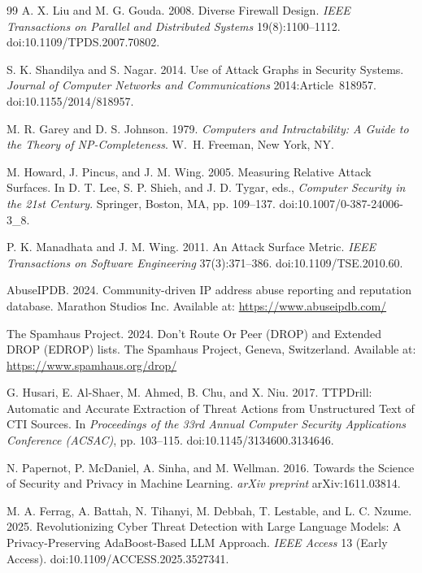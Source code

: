 \documentclass[unnumsec,webpdf,contemporary,large]{oup-authoring-template}
\theoremstyle{thmstyleone}
\theoremstyle{thmstyletwo}
\theoremstyle{thmstylethree}
\begin{document}
\begin{thebibliography}{99}
A. X. Liu and M. G. Gouda. 2008. Diverse Firewall Design.
\textit{IEEE Transactions on Parallel and Distributed Systems}
19(8):1100--1112. doi:10.1109/TPDS.2007.70802.

S. K. Shandilya and S. Nagar. 2014. Use of Attack Graphs in Security Systems.
\textit{Journal of Computer Networks and Communications} 2014:Article~818957.
doi:10.1155/2014/818957.

M. R. Garey and D. S. Johnson. 1979. \textit{Computers and Intractability:
A Guide to the Theory of NP-Completeness}. W.~H. Freeman, New York, NY.

M. Howard, J. Pincus, and J. M. Wing. 2005. Measuring Relative Attack Surfaces.
In D. T. Lee, S. P. Shieh, and J. D. Tygar, eds., \textit{Computer Security in the
21st Century}. Springer, Boston, MA, pp. 109--137.
doi:10.1007/0-387-24006-3\_8.

P. K. Manadhata and J. M. Wing. 2011. An Attack Surface Metric.
\textit{IEEE Transactions on Software Engineering} 37(3):371--386.
doi:10.1109/TSE.2010.60.

AbuseIPDB. 2024. Community-driven IP address abuse reporting and reputation database.
Marathon Studios Inc. Available at: \url{https://www.abuseipdb.com/}

The Spamhaus Project. 2024. Don't Route Or Peer (DROP) and Extended DROP (EDROP)
lists. The Spamhaus Project, Geneva, Switzerland. Available at:
\url{https://www.spamhaus.org/drop/}

G. Husari, E. Al-Shaer, M. Ahmed, B. Chu, and X. Niu. 2017. TTPDrill: Automatic and
Accurate Extraction of Threat Actions from Unstructured Text of CTI Sources.
In \textit{Proceedings of the 33rd Annual Computer Security Applications Conference
(ACSAC)}, pp. 103--115. doi:10.1145/3134600.3134646.

N. Papernot, P. McDaniel, A. Sinha, and M. Wellman. 2016. Towards the Science of
Security and Privacy in Machine Learning. \textit{arXiv preprint} arXiv:1611.03814.

M. A. Ferrag, A. Battah, N. Tihanyi, M. Debbah, T. Lestable, and L. C. Nzume. 2025.
Revolutionizing Cyber Threat Detection with Large Language Models: A Privacy-Preserving
AdaBoost-Based LLM Approach. \textit{IEEE Access} 13 (Early Access).
doi:10.1109/ACCESS.2025.3527341.


\end{thebibliography}
\end{document}
